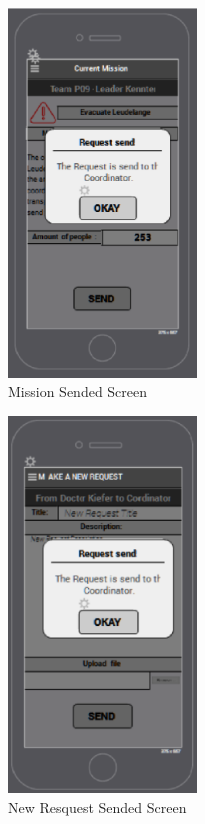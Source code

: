 \begin{figure}[htbp]
\begin{center}
 \caption{\label{fig:A16} Mission Sended Screen}
   \includegraphics[width=50mm]{./images/App/missionsendedscreen.eps}
\end{center}
\end{figure}
\begin{figure}[htbp]
\begin{center}
 \caption{\label{fig:A17} New Resquest Sended Screen}
   \includegraphics[width=50mm]{./images/App/requstsendedconfirm.eps}
\end{center}
\end{figure}
